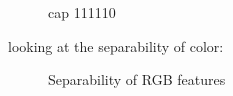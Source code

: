 \begin{figure}[!hbt]
\centering
{}
\caption{cap 111110}
\label{fig:111110}
\end{figure}

looking at the separability of color:


\begin{figure}[!hbt]
\centering
{}
\caption{Separability of RGB features}
\label{fig:mrgb}
\end{figure}

